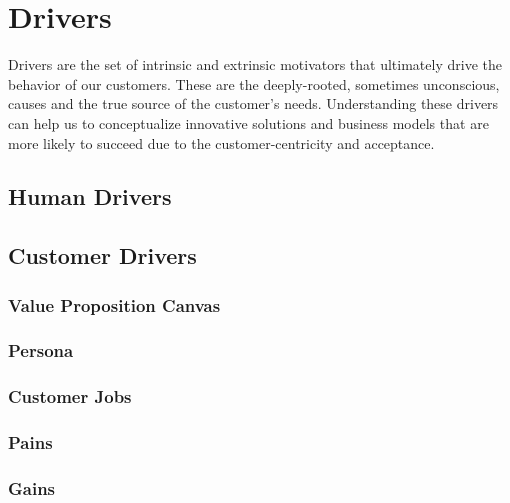 \section{Drivers}
\label{sec:drivers}

Drivers are the set of intrinsic and extrinsic motivators that ultimately drive the behavior of our customers.
These are the deeply-rooted, sometimes unconscious, causes and the true source of the customer's needs. Understanding
these drivers can help us to conceptualize innovative solutions and business models that are more likely to succeed due
to the customer-centricity and acceptance.

\subsection{Human Drivers}

\subsection{Customer Drivers}

\subsubsection{Value Proposition Canvas}

\subsubsection{Persona}

\subsubsection{Customer Jobs}

\subsubsection{Pains}

\subsubsection{Gains}
